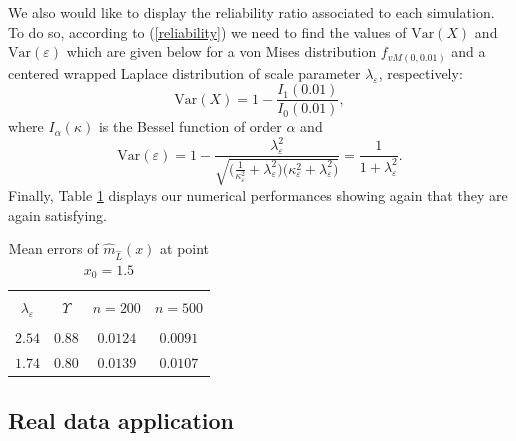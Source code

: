 \documentclass[11pt,a4paper,openany]{article}
\newcommand{\Var}{\mbox{Var}}
\begin{document}

We also would like  to display the reliability ratio associated to each simulation. To do so, according to (\ref{reliability}) we need to find the values of $\Var(X)$ and $\Var(\varepsilon)$ which are given below for a von Mises distribution $f_{vM(0, 0.01)}$ and a centered wrapped Laplace distribution of scale parameter $\lambda_\varepsilon$, respectively: 
  $$\Var(X) = 1 - \dfrac{I_{1}(0.01)}{I_{0}(0.01)},$$ where $I_{\alpha}(\kappa)$ is the Bessel function of order $\alpha $ and 
\begin{equation}\label{var.wrappedLaplace}
	\Var(\varepsilon) = 1 - \dfrac{ \lambda_{\varepsilon}^{2} }{ \sqrt{ \big( \frac{1}{ \kappa_{\varepsilon}^{2} } + \lambda_{\varepsilon}^{2}  \big)  \big(  \kappa_{\varepsilon}^{2} + \lambda_{\varepsilon}^{2}  \big) } } = \dfrac{1}{1 + \lambda_{\varepsilon}^{2}} . 
\end{equation}
Finally, Table \ref{numerical.results:table:MAE.circular-predictor} displays our numerical performances showing again that they are again satisfying. 
\begin{table}[ht!]  
	\begin{center}
		\begin{tabular}{c  c || c  c }
			& %
			\\[0.1cm]   
			$\lambda_{\varepsilon}$ & $\Upsilon$ & $n = 200$ & $n = 500$ 
			\\[0.2cm]
			\hline  
			& &  
			\\[-0.2cm] $2.54$ & $0.88 $&  $0.0124$ & $0.0091$ 
			\\[0.2cm]
			$1.74$ & $0.80$ &  $0.0139$  &  $0.0107$
		\end{tabular}
	\end{center} 
	\caption{Mean errors  of $\widehat{m}_{\hat L}(x)$ at point $x_0=1.5$}
	\label{numerical.results:table:MAE.circular-predictor}
\end{table} 




\subsection{Real data application}
\end{document}
